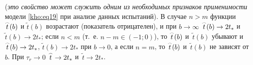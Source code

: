 (\textit{это свойство может служить одним из необходимых признаков применимости }модели \eqref{kho:eq19} при анализе данных испытаний). В случае $n>m$ функции $\mathord{\buildrel{\lower3pt\hbox{$\scriptscriptstyle\frown$}}\over{t}}(b)$ и $\tilde{t}(b)$ возрастают (показатель отрицателен), и при $b\to\infty$ $\mathord{\buildrel{\lower3pt\hbox{$\scriptscriptstyle\frown$}}\over{t}}(b)\to2t_\ast$ и~$\tilde{t}(b)\to2t_\ast$; если $n<m$ (т.~е. $n-m\in(-1;0)$), то $\mathord{\buildrel{\lower3pt\hbox{$\scriptscriptstyle\frown$}}\over{t}}(b)$ и~$\tilde{t}(b)$ убывают и $\mathord{\buildrel{\lower3pt\hbox{$\scriptscriptstyle\frown$}}\over{t}}(b)\to2t_\ast$, $\tilde{t}(b)\to2t_\ast$ при $b\to0$, а если $n=m$, то $\mathord{\buildrel{\lower3pt\hbox{$\scriptscriptstyle\frown$}}\over{t}}(b)$ и~$\tilde{t}(b)$ не зависят от $b$. При $\tau_r\to0$ $\mathord{\buildrel{\lower3pt\hbox{$\scriptscriptstyle\frown$}}\over{t}}\to2t_\ast$ и~$\tilde{t}\to2t_\ast$.



